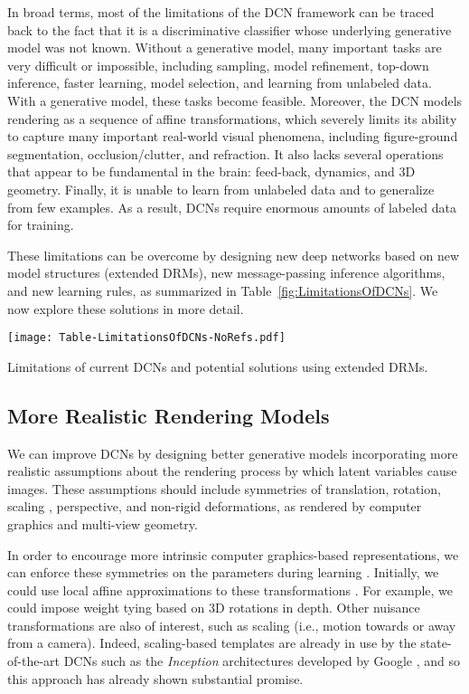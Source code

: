 \documentclass[12pt]{article}
\begin{document}
In broad terms, most of the limitations of the DCN framework can be traced back to the fact that it is a discriminative classifier whose underlying generative model was not known. 
Without a generative model, many important tasks are very difficult or impossible, including sampling, model refinement, top-down inference, faster learning, model selection, and learning from unlabeled data. 
With a generative model, these tasks become feasible. 
Moreover, the DCN models rendering as a sequence of affine transformations, which severely limits its ability to capture many important real-world visual phenomena, including figure-ground segmentation, occlusion/clutter, and refraction. 
It also lacks several operations that appear to be fundamental in the brain: feed-back, dynamics, and 3D geometry. 
Finally, it is unable to learn from unlabeled data and to generalize from few examples. As a result, DCNs require enormous amounts of labeled data for training. 

These limitations can be overcome by designing new deep networks based on new model structures (extended DRMs), new message-passing inference algorithms, and new learning rules, as summarized in Table~\ref{fig:LimitationsOfDCNs}. We now explore these solutions in more detail.

\begin{table}
   \centering
      \texttt{[image: Table-LimitationsOfDCNs-NoRefs.pdf]} 
   \caption{Limitations of current DCNs and potential solutions using extended DRMs.}
   \label{fig:LimitationsOfDCNs}
\end{table}

\subsection{More Realistic Rendering Models}

We can improve DCNs by designing better generative models incorporating more realistic assumptions about the rendering process by which latent variables cause images. These assumptions should include symmetries of translation, rotation, scaling \cite{bruna2013invariant}, perspective, and non-rigid deformations, as rendered by computer graphics and multi-view geometry. 

In order to encourage more intrinsic computer graphics-based representations, we can enforce these symmetries on the parameters during learning \cite{miao2007learning, anselmi2013unsupervised}. Initially, we could use local affine approximations to these transformations \cite{sohl2010unsupervised}. For example, we could impose weight tying based on 3D rotations in depth. Other nuisance transformations are also of interest, such as scaling (i.e., motion towards or away from a camera).
Indeed, scaling-based templates are already in use by the state-of-the-art DCNs such as the \emph{Inception} architectures developed by Google \cite{szegedy2014going}, and so this approach has already shown substantial promise.  
\end{document}
